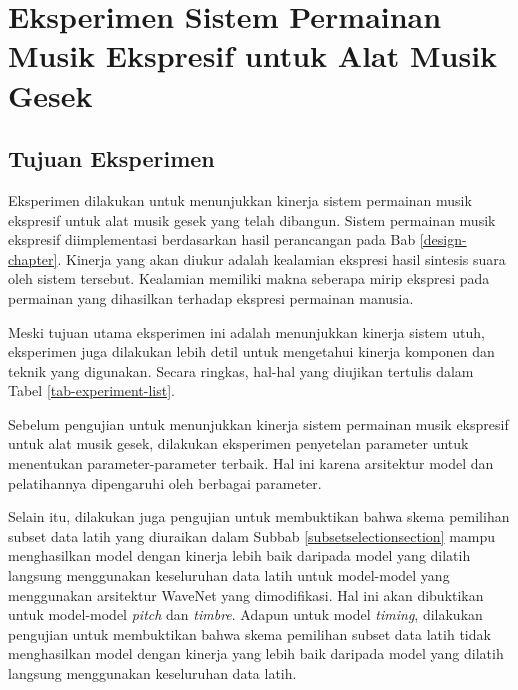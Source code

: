 \chapter{Eksperimen Sistem Permainan Musik Ekspresif untuk Alat Musik Gesek}

\section{Tujuan Eksperimen}

Eksperimen dilakukan untuk menunjukkan kinerja sistem permainan musik ekspresif untuk alat musik gesek yang telah dibangun. Sistem permainan musik ekspresif diimplementasi berdasarkan hasil perancangan pada Bab \ref{design-chapter}. Kinerja yang akan diukur adalah kealamian ekspresi hasil sintesis suara oleh sistem tersebut. Kealamian memiliki makna seberapa mirip ekspresi pada permainan yang dihasilkan terhadap ekspresi permainan manusia.

Meski tujuan utama eksperimen ini adalah menunjukkan kinerja sistem utuh, eksperimen juga dilakukan lebih detil untuk mengetahui kinerja komponen dan teknik yang digunakan. Secara ringkas, hal-hal yang diujikan tertulis dalam Tabel \ref{tab-experiment-list}.

Sebelum pengujian untuk menunjukkan kinerja sistem permainan musik ekspresif untuk alat musik gesek, dilakukan eksperimen penyetelan parameter untuk menentukan parameter-parameter terbaik. Hal ini karena arsitektur model dan pelatihannya dipengaruhi oleh berbagai parameter.

Selain itu, dilakukan juga pengujian untuk membuktikan bahwa skema pemilihan subset data latih yang diuraikan dalam Subbab \ref{subsetselectionsection} mampu menghasilkan model dengan kinerja lebih baik daripada model yang dilatih langsung menggunakan keseluruhan data latih untuk model-model yang menggunakan arsitektur WaveNet yang dimodifikasi. Hal ini akan dibuktikan untuk model-model \textit{pitch} dan \textit{timbre}. Adapun untuk model \textit{timing}, dilakukan pengujian untuk membuktikan bahwa skema pemilihan subset data latih tidak menghasilkan model dengan kinerja yang lebih baik daripada model yang dilatih langsung menggunakan keseluruhan data latih.

